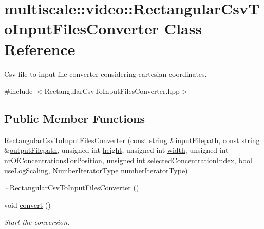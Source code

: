\hypertarget{classmultiscale_1_1video_1_1RectangularCsvToInputFilesConverter}{\section{multiscale\-:\-:video\-:\-:\-Rectangular\-Csv\-To\-Input\-Files\-Converter \-Class \-Reference}
\label{classmultiscale_1_1video_1_1RectangularCsvToInputFilesConverter}
}


\-Csv file to input file converter considering cartesian coordinates.  




{\ttfamily \#include $<$\-Rectangular\-Csv\-To\-Input\-Files\-Converter.\-hpp$>$}

\subsection*{\-Public \-Member \-Functions}
\begin{DoxyCompactItemize}
\item 
\hyperlink{classmultiscale_1_1video_1_1RectangularCsvToInputFilesConverter_a7c0f23d2937406a81a0ed04abf2ef9d3}{\-Rectangular\-Csv\-To\-Input\-Files\-Converter} (const string \&\hyperlink{classmultiscale_1_1video_1_1RectangularCsvToInputFilesConverter_a407e3c2607f036d531445e22454a910e}{input\-Filepath}, const string \&\hyperlink{classmultiscale_1_1video_1_1RectangularCsvToInputFilesConverter_a2bb6a802fac9b0928bc53a8c71a1c33c}{output\-Filepath}, unsigned int \hyperlink{classmultiscale_1_1video_1_1RectangularCsvToInputFilesConverter_a766bc7eea1c602f46a4a6c0948464c8a}{height}, unsigned int \hyperlink{classmultiscale_1_1video_1_1RectangularCsvToInputFilesConverter_a7fe7f3d014535567fbeb465eb01cde1b}{width}, unsigned int \hyperlink{classmultiscale_1_1video_1_1RectangularCsvToInputFilesConverter_a0bfea1eb0f7dc76deee05af1e2eb744b}{nr\-Of\-Concentrations\-For\-Position}, unsigned int \hyperlink{classmultiscale_1_1video_1_1RectangularCsvToInputFilesConverter_a5143d25a98a097107c2bed748b4d8df0}{selected\-Concentration\-Index}, bool \hyperlink{classmultiscale_1_1video_1_1RectangularCsvToInputFilesConverter_a7739ee04a9340d981896861904022f26}{use\-Log\-Scaling}, \hyperlink{namespacemultiscale_a6ef911f4d48a4bf5e657c237ec169ff5}{\-Number\-Iterator\-Type} number\-Iterator\-Type)
\item 
\hyperlink{classmultiscale_1_1video_1_1RectangularCsvToInputFilesConverter_ad45bb79ad6c37954376d4f9904872870}{$\sim$\-Rectangular\-Csv\-To\-Input\-Files\-Converter} ()
\item 
void \hyperlink{classmultiscale_1_1video_1_1RectangularCsvToInputFilesConverter_a5872c0ae1f39c52103ed3e62a388f80b}{convert} ()
\begin{DoxyCompactList}\small\item\em \-Start the conversion. \end{DoxyCompactList}\end{DoxyCompactItemize}
